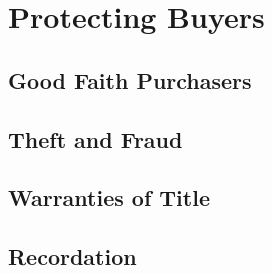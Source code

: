 \chapter{Protecting Buyers}



\section{Good Faith Purchasers}



\begin{questions}

\end{questions}




\begin{questions}

\end{questions}



\section{Theft and Fraud}



\begin{questions}

\end{questions}



\section{Warranties of Title}




\begin{questions}

\end{questions}



\begin{questions}



\end{questions}


\section{Recordation}







\begin{questions}

\end{questions}


